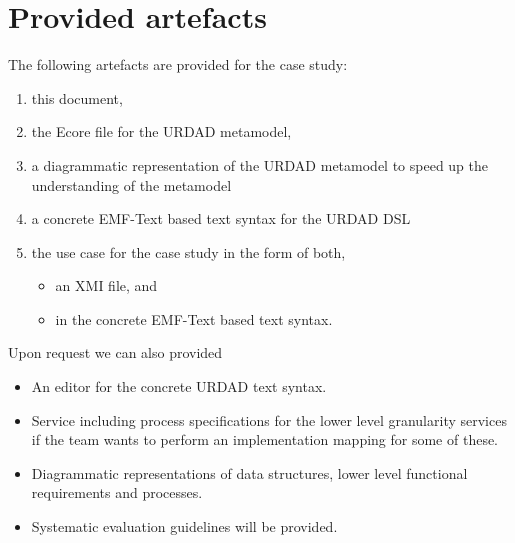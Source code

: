\section{Provided artefacts}

The following artefacts are provided for the case study:
\begin{enumerate}
  \item this document,
  \item the Ecore file for the URDAD metamodel,
  \item a diagrammatic representation of the URDAD metamodel to speed up the understanding of the metamodel
  \item a concrete EMF-Text based text syntax for the URDAD DSL
  \item the use case for the case study in the form of both, 
    \begin{itemize}
     \item an XMI file, and
     \item in the concrete EMF-Text based text syntax.
    \end{itemize}
\end{enumerate}

Upon request we can also provided
\begin{itemize}
  \item An editor for the concrete URDAD text syntax.
  \item Service including process specifications for the lower level granularity services if the team wants to perform an implementation mapping for some of these.
  \item Diagrammatic representations of data structures, lower level functional requirements and processes.
  \item Systematic evaluation guidelines will be provided.
\end{itemize}

